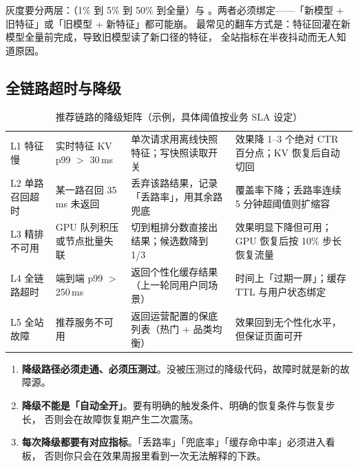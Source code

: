 灰度要分两层：（1\% 到 5\% 到 50\% 到全量）与
。两者必须绑定——「新模型 + 旧特征」或「旧模型 + 新特征」都可能崩。
最常见的翻车方式是：特征回灌在新模型全量前完成，导致旧模型读了新口径的特征，
全站指标在半夜抖动而无人知道原因。

\subsection{全链路超时与降级}

\begin{table}[htbp]
\centering
\caption{推荐链路的降级矩阵（示例，具体阈值按业务 SLA 设定）}
\label{tab:degrade}
\small
\begin{tabularx}{\textwidth}{L{1.9cm} L{2.6cm} L{3.2cm} Y}
\toprule
{} &  &  &  \\
\midrule
L1 特征慢 & 实时特征 KV p99 $>$ 30\,ms & 单次请求用离线快照特征；写快照读取开关 & 效果降 1--3 个绝对 CTR 百分点；KV 恢复后自动切回 \\
\addlinespace
L2 单路召回超时 & 某一路召回 35\,ms 未返回 & 丢弃该路结果，记录「丢路率」，用其余路兜底 & 覆盖率下降；丢路率连续 5 分钟超阈值则扩缩容 \\
\addlinespace
L3 精排不可用 & GPU 队列积压或节点批量失联 & 切到粗排分数直接出结果；候选数降到 1/3 & 效果明显下降但可用；GPU 恢复后按 10\% 步长恢复流量 \\
\addlinespace
L4 全链路超时 & 端到端 p99 $>$ 250\,ms & 返回个性化缓存结果（上一轮同用户同场景） & 时间上「过期一屏」；缓存 TTL 与用户状态绑定 \\
\addlinespace
L5 全站故障 & 推荐服务不可用 & 返回运营配置的保底列表（热门 + 品类均衡） & 效果回到无个性化水平，但保证页面可开 \\
\bottomrule
\end{tabularx}
\end{table}

\begin{keypoint}[降级设计的三个不变量]
\begin{enumerate}
  \item \textbf{降级路径必须走通、必须压测过}。没被压测过的降级代码，故障时就是新的故障源。
  \item \textbf{降级不能是「自动全开」}。要有明确的触发条件、明确的恢复条件与恢复步长，
        否则会在故障恢复期产生二次震荡。
  \item \textbf{每次降级都要有对应指标}。「丢路率」「兜底率」「缓存命中率」必须进入看板，
        否则你只会在效果周报里看到一次无法解释的下跌。
\end{enumerate}
\end{keypoint}

